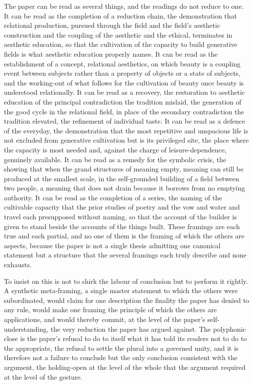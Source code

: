 The paper can be read as several things, and the readings do not reduce to one. It can be read as the completion of a reduction chain, the demonstration that relational production, pursued through the field and the field's aesthetic construction and the coupling of the aesthetic and the ethical, terminates in aesthetic education, so that the cultivation of the capacity to build generative fields is what aesthetic education properly names. It can be read as the establishment of a concept, relational aesthetics, on which beauty is a coupling event between subjects rather than a property of objects or a state of subjects, and the working-out of what follows for the cultivation of beauty once beauty is understood relationally. It can be read as a recovery, the restoration to aesthetic education of the principal contradiction the tradition mislaid, the generation of the good cycle in the relational field, in place of the secondary contradiction the tradition elevated, the refinement of individual taste. It can be read as a defence of the everyday, the demonstration that the most repetitive and unspacious life is not excluded from generative cultivation but is its privileged site, the place where the capacity is most needed and, against the charge of leisure-dependence, genuinely available. It can be read as a remedy for the symbolic crisis, the showing that when the grand structures of meaning empty, meaning can still be produced at the smallest scale, in the self-grounded building of a field between two people, a meaning that does not drain because it borrows from no emptying authority. It can be read as the completion of a series, the naming of the cultivable capacity that the prior studies of poetry and the vow and water and travel each presupposed without naming, so that the account of the builder is given to stand beside the accounts of the things built. These framings are each true and each partial, and no one of them is the framing of which the others are aspects, because the paper is not a single thesis admitting one canonical statement but a structure that the several framings each truly describe and none exhausts.

To insist on this is not to shirk the labour of conclusion but to perform it rightly. A synthetic meta-framing, a single master statement to which the others were subordinated, would claim for one description the finality the paper has denied to any rule, would make one framing the principle of which the others are applications, and would thereby commit, at the level of the paper's self-understanding, the very reduction the paper has argued against. The polyphonic close is the paper's refusal to do to itself what it has told its readers not to do to the appropriate, the refusal to settle the plural into a governed unity, and it is therefore not a failure to conclude but the only conclusion consistent with the argument, the holding-open at the level of the whole that the argument required at the level of the gesture.

